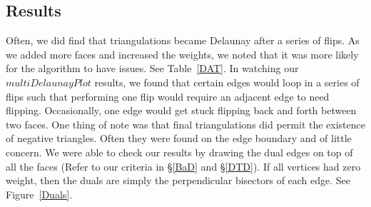 \documentclass[12pt]{article}
\begin{document}
\subsection{Results}
\noindent Often, we did find that triangulations became Delaunay after a series of flips. As we added more faces and increased the weights, we noted that it was more likely for the algorithm to have issues. See Table~\ref{DAT}. In watching our $multiDelaunayPlot$ results, we found that certain edges would loop in a series of flips such that performing one flip would require an adjacent edge to need flipping. Occasionally, one edge would get stuck flipping back and forth between two faces. One thing of note was that final triangulations did permit the existence of negative triangles. Often they were found on the edge boundary and of little concern. We were able to check our results by drawing the dual edges on top of all the faces (Refer to our criteria in \S\ref{BaD} and \S\ref{DTD}). If all vertices had zero weight, then the duals are simply the perpendicular bisectors of each edge. See Figure~\ref{Duals}. \newline
\end{document}
